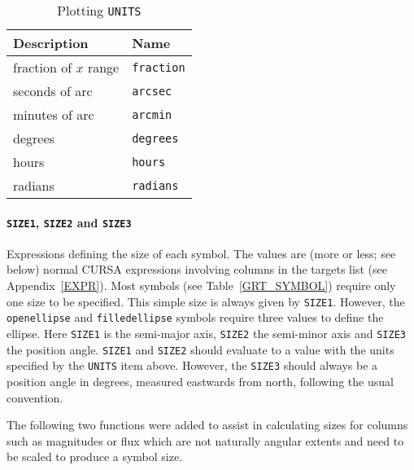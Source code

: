 \documentclass[twoside,11pt]{starlink}
\begin{document}
\begin{table}[htbp]

\begin{center}
\begin{tabular}{ll}
Description             & Name           \\ \hline
fraction of $x$\/ range & \texttt{fraction} \\
seconds of arc          & \texttt{arcsec}   \\
minutes of arc          & \texttt{arcmin}   \\
degrees                 & \texttt{degrees}  \\
hours                   & \texttt{hours}    \\
radians                 & \texttt{radians}  \\
\end{tabular}

\caption{Plotting \texttt{UNITS} \label{GRT_UNITS} }
\end{center}

\end{table}


\paragraph{\texttt{SIZE1}, \texttt{SIZE2} and \texttt{SIZE3}} Expressions defining the
size of each symbol.  The values are (more or less; see below) normal CURSA
expressions involving columns in the targets list (see Appendix~\ref{EXPR}).
Most symbols (see Table~\ref{GRT_SYMBOL}) require only one size to be
specified.  This simple size is always given by \texttt{SIZE1}.  However, the
\texttt{openellipse} and \texttt{filledellipse} symbols require three values to
define the ellipse.  Here \texttt{SIZE1} is the semi-major axis, \texttt{SIZE2}
the semi-minor axis and \texttt{SIZE3} the position angle.  \texttt{SIZE1} and
\texttt{SIZE2} should evaluate to a value with the units specified by the \texttt{UNITS} item above.  However, the \texttt{SIZE3} should always be a position
angle in degrees, measured eastwards from north, following the usual
convention.

The following two functions were added to assist in calculating sizes for
columns such as magnitudes or flux which are not naturally angular extents
and need to be scaled to produce a symbol size.
\end{document}
